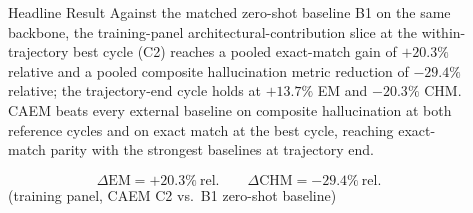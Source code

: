 \documentclass[final]{beamer}
\newlength{\sepwidth}
\newlength{\colwidth}
\newcommand{\separatorcolumn}{\begin{column}{\sepwidth}\end{column}}
\begin{document}
\begin{frame}[t]
\begin{columns}[t]
\begin{column}{\colwidth}
\end{column}

\separatorcolumn


\begin{column}{\colwidth}

  \begin{block}{Headline Result}
    Against the matched zero-shot baseline B1 on the same backbone, the
    training-panel architectural-contribution slice at the within-trajectory
    best cycle (C2) reaches a pooled exact-match gain of $+20.3\%$ relative
    and a pooled composite hallucination metric reduction of $-29.4\%$
    relative; the trajectory-end cycle holds at $+13.7\%$ EM and $-20.3\%$
    CHM. CAEM beats every external baseline on composite hallucination at
    both reference cycles and on exact match at the best cycle, reaching
    exact-match parity with the strongest baselines at trajectory end.

    \[
      \boxed{\Delta\mathrm{EM} = +20.3\%\ \text{rel.}} \qquad
      \boxed{\Delta\mathrm{CHM} = -29.4\%\ \text{rel.}}
    \]
    \centering\footnotesize
    (training panel, CAEM C2 vs.\ B1 zero-shot baseline)
  \end{block}


\end{column}
\end{columns}
\end{frame}
\end{document}
